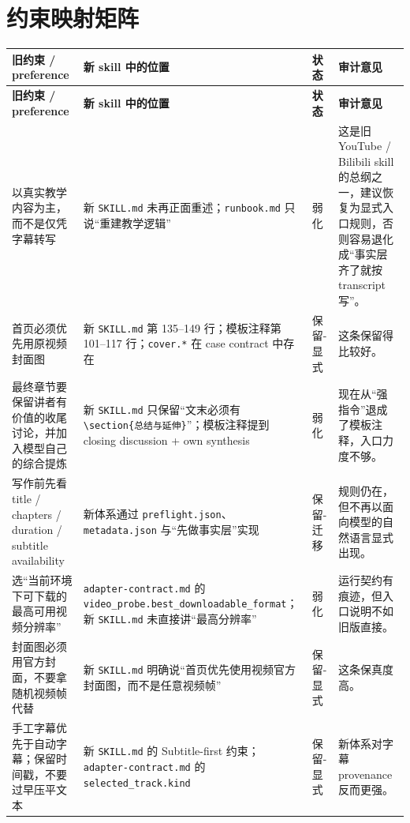 \documentclass[a4paper]{article}
\begin{document}
\section{约束映射矩阵}

\renewcommand{\arraystretch}{1.22}
\small
\begin{longtable}{p{3.1cm}p{5.1cm}p{1.8cm}p{4.7cm}}
\toprule
\textbf{旧约束 / preference} & \textbf{新 skill 中的位置} & \textbf{状态} & \textbf{审计意见} \\
\midrule
\endfirsthead
\toprule
\textbf{旧约束 / preference} & \textbf{新 skill 中的位置} & \textbf{状态} & \textbf{审计意见} \\
\midrule
\endhead

以真实教学内容为主，而不是仅凭字幕转写 & 新 \texttt{SKILL.md} 未再正面重述；\texttt{runbook.md} 只说“重建教学逻辑” & 弱化 & 这是旧 YouTube / Bilibili skill 的总纲之一，建议恢复为显式入口规则，否则容易退化成“事实层齐了就按 transcript 写”。 \\

首页必须优先用原视频封面图 & 新 \texttt{SKILL.md} 第 135--149 行；模板注释第 101--117 行；\texttt{cover.*} 在 case contract 中存在 & 保留-显式 & 这条保留得比较好。 \\

最终章节要保留讲者有价值的收尾讨论，并加入模型自己的综合提炼 & 新 \texttt{SKILL.md} 只保留“文末必须有 \texttt{\textbackslash section\{总结与延伸\}}”；模板注释提到 closing discussion + own synthesis & 弱化 & 现在从“强指令”退成了模板注释，入口力度不够。 \\

写作前先看 title / chapters / duration / subtitle availability & 新体系通过 \texttt{preflight.json}、\texttt{metadata.json} 与“先做事实层”实现 & 保留-迁移 & 规则仍在，但不再以面向模型的自然语言显式出现。 \\

选“当前环境下可下载的最高可用视频分辨率” & \texttt{adapter-contract.md} 的 \texttt{video\_probe.best\_downloadable\_format}；新 \texttt{SKILL.md} 未直接讲“最高分辨率” & 弱化 & 运行契约有痕迹，但入口说明不如旧版直接。 \\

封面图必须用官方封面，不要拿随机视频帧代替 & 新 \texttt{SKILL.md} 明确说“首页优先使用视频官方封面图，而不是任意视频帧” & 保留-显式 & 这条保真度高。 \\

手工字幕优先于自动字幕；保留时间戳，不要过早压平文本 & 新 \texttt{SKILL.md} 的 Subtitle-first 约束；\texttt{adapter-contract.md} 的 \texttt{selected\_track.kind} & 保留-显式 & 新体系对字幕 provenance 反而更强。 \\


\end{longtable}
\end{document}
